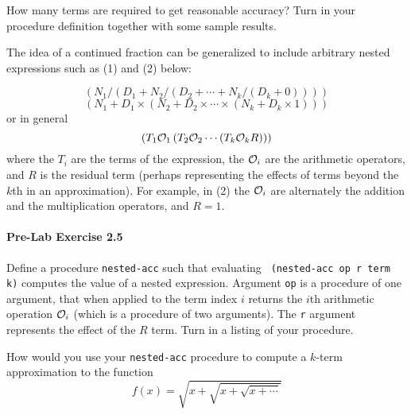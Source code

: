 How many terms are required to get
reasonable accuracy?  Turn in your procedure definition
together with some sample results.

The idea of a continued fraction can be generalized to include
arbitrary nested expressions such as (1) and (2) below:

\begin{equation}
\left( {N_1/\left( {D_1+N_2/\left( {D_2+\cdots +N_k/\left( {D_k+0}
\right)} \right)} \right)} \right)
\end{equation}
\begin{equation}
\left( {N_1+D_1\times \left( {N_2+D_2\times \cdots \times \left(
{N_k+D_k\times 1} \right)} \right)} \right)
\end{equation}
or in general
\begin{displaymath}
\left( T_1 {\cal O}_1 \left( T_2 {\cal O}_2 \cdots
            \left( T_k {\cal O}_k R \right) \right) \right)
\end{displaymath}
where the $T_i$ are the terms of the expression,
the ${\cal O}_i$ are the arithmetic operators, and $R$ is the
residual term (perhaps representing the effects of
terms beyond the $k$th in an approximation). For example,
in (2) the ${\cal O}_i$ are alternately the addition and the
multiplication operators, and $R=1$.

\paragraph{Pre-Lab Exercise 2.5}
Define a procedure {\tt nested-acc} such that evaluating {\tt
(nested-acc op r term k)} computes the value of a nested expression.
Argument {\tt op} is a procedure of one argument, that when applied to
the term index $i$ returns the $i$th arithmetic operation ${\cal O}_i$
(which is a procedure of two arguments).  The {\tt r} argument
represents the effect of the $R$ term.  Turn in a listing of your
procedure.

How would you use your {\tt nested-acc} procedure to
compute a $k$-term approximation to the function
\begin{displaymath}
f(x)=\sqrt {x+\sqrt {x+\sqrt {x+\cdots }}}
\end{displaymath}

